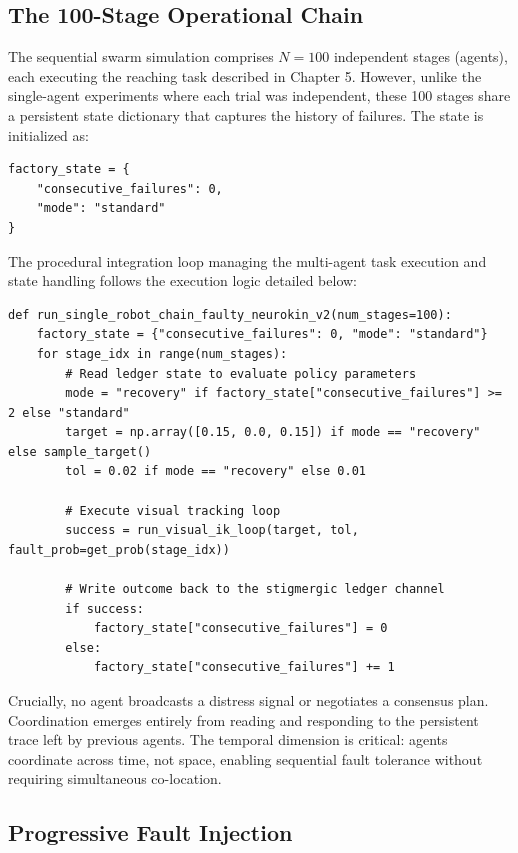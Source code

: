 \documentclass[12pt,a4paper,oneside]{report}
\begin{document}
\subsection{The 100-Stage Operational Chain}

The sequential swarm simulation comprises $N = 100$ independent stages (agents), each executing the reaching task described in Chapter 5. However, unlike the single-agent experiments where each trial was independent, these 100 stages share a persistent state dictionary that captures the history of failures. The state is initialized as:
\begin{verbatim}
factory_state = {
    "consecutive_failures": 0,
    "mode": "standard"
}
\end{verbatim}

The procedural integration loop managing the multi-agent task execution and state handling follows the execution logic detailed below:
\begin{minipage}{\linewidth}
\begin{verbatim}
def run_single_robot_chain_faulty_neurokin_v2(num_stages=100):
    factory_state = {"consecutive_failures": 0, "mode": "standard"}
    for stage_idx in range(num_stages):
        # Read ledger state to evaluate policy parameters
        mode = "recovery" if factory_state["consecutive_failures"] >= 2 else "standard"
        target = np.array([0.15, 0.0, 0.15]) if mode == "recovery" else sample_target()
        tol = 0.02 if mode == "recovery" else 0.01
        
        # Execute visual tracking loop
        success = run_visual_ik_loop(target, tol, fault_prob=get_prob(stage_idx))
        
        # Write outcome back to the stigmergic ledger channel
        if success:
            factory_state["consecutive_failures"] = 0
        else:
            factory_state["consecutive_failures"] += 1
\end{verbatim}
\end{minipage}

Crucially, no agent broadcasts a distress signal or negotiates a consensus plan. Coordination emerges entirely from reading and responding to the persistent trace left by previous agents. The temporal dimension is critical: agents coordinate across time, not space, enabling sequential fault tolerance without requiring simultaneous co-location.

\subsection{Progressive Fault Injection}
\end{document}
